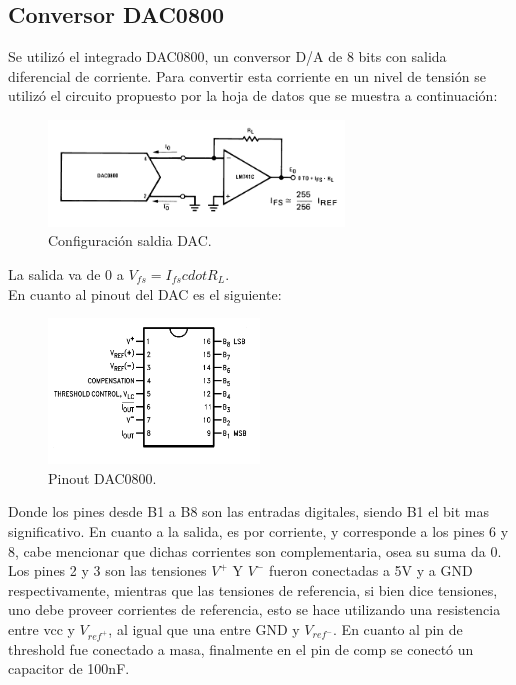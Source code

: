 \subsection{Conversor DAC0800}
Se utilizó el integrado DAC0800, un conversor D/A de 8 bits con salida diferencial de corriente.
Para convertir esta corriente en un nivel de tensión se utilizó el circuito propuesto por la hoja de datos que se muestra a continuación:
\begin{figure}[H]
	\centering
	\includegraphics[width=0.7\textwidth]{ImagenesEjercicio1/dacout.png}
\caption{Configuración saldia DAC.}
	\label{fig:dacout}
\end{figure}
La salida va de 0 a $V_{fs}= I_{fs}cdot R_L$.\\
En cuanto al pinout del DAC es el siguiente:
\begin{figure}[H]
	\centering
	\includegraphics[width=0.5\textwidth]{ImagenesEjercicio1/dacpinout.png}
\caption{Pinout DAC0800.}
	\label{fig:dapinout}
\end{figure}
Donde los pines desde B1 a B8 son las entradas digitales, siendo B1 el bit mas significativo. En cuanto a la salida, es por corriente, y corresponde a los pines 6 y 8, cabe mencionar que dichas corrientes son complementaria, osea su suma da 0. Los pines 2 y 3 son las tensiones $V^+$ Y $V^-$ fueron conectadas a 5V y a GND respectivamente, mientras que las tensiones de referencia, si bien dice tensiones, uno debe proveer corrientes de referencia, esto se hace utilizando una resistencia entre vcc y $V_{ref^+}$, al igual que una entre GND y $V_{ref^-}$. En cuanto al pin de threshold fue conectado a masa, finalmente en el pin de comp se conectó un capacitor de 100nF.

